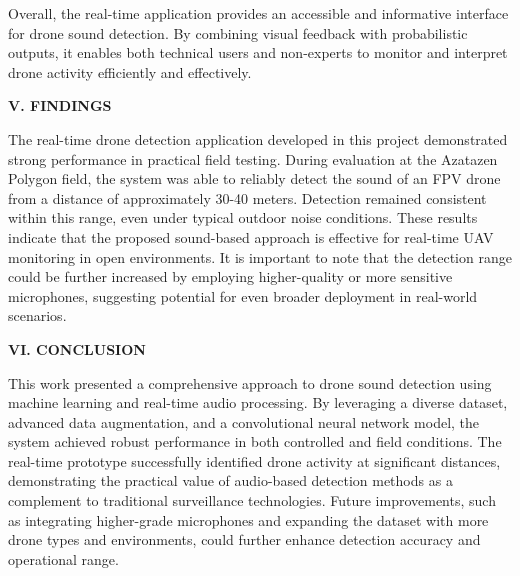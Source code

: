 \documentclass[12pt]{article}
\begin{document}
{Overall, the real-time application provides an accessible and informative interface for drone sound detection. By combining visual feedback with probabilistic outputs, it enables both technical users and non-experts to monitor and interpret drone activity efficiently and effectively.

}

\begin{center}
{\fontsize{9}{11}\selectfont\bfseries V. FINDINGS}
\end{center}

\vspace{0.2em}

{\fontsize{9}{11}\selectfont
\indent The real-time drone detection application developed in this project demonstrated strong performance in practical field testing. During evaluation at the 
Azatazen Polygon field, the system was able to reliably detect the sound of an FPV drone from a distance of approximately 30-40 meters. Detection remained consistent within this range, even under typical outdoor noise conditions. These results indicate that the proposed sound-based approach is effective for real-time UAV monitoring in open environments. It is important to note that the detection range could be further increased by employing higher-quality or more sensitive microphones, suggesting potential for even broader deployment in real-world scenarios.

}

\begin{center}
{\fontsize{9}{11}\selectfont\bfseries VI. CONCLUSION }
\end{center}

\vspace{0.2em}

{\fontsize{9}{11}\selectfont
\indent This work presented a comprehensive approach to drone sound detection using machine learning and real-time audio processing. By leveraging a diverse dataset, advanced data augmentation, and a convolutional neural network model, the system achieved robust performance in both controlled and field conditions. The real-time prototype successfully identified drone activity at significant distances, demonstrating the practical value of audio-based detection methods as a complement to traditional surveillance technologies. Future improvements, such as integrating higher-grade microphones and expanding the dataset with more drone types and environments, could further enhance detection accuracy and operational range.

}
\end{document}

